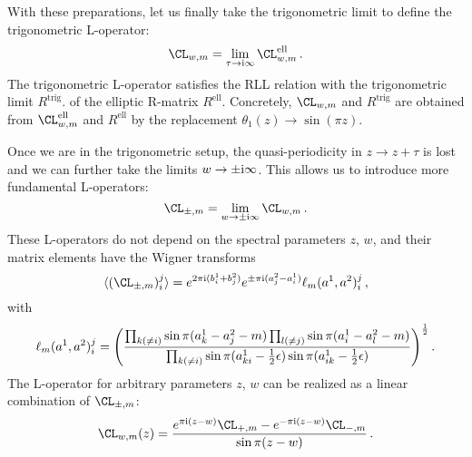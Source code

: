 With these preparations, let us finally take the trigonometric limit
to define the trigonometric L-operator:
\begin{equation}
  \CL_{w,m}
  = \lim_{\tau \to \iu\infty} \CL^{\text{ell}}_{w,m} \,.
\end{equation}
The trigonometric L-operator satisfies the RLL relation with the
trigonometric limit $R^{\text{trig}}$. of the elliptic R-matrix
$R^{\text{ell}}$.  Concretely, $\CL_{w,m}$ and $R^{\text{trig}}$ are
obtained from $\CL^{\text{ell}}_{w,m}$ and $R^{\text{ell}}$ by the
replacement $\theta_1(z) \to \sin(\pi z)$.

Once we are in the trigonometric setup, the quasi-periodicity in
$z \to z + \tau$ is lost and we can further take the limits
$w \to \pm\mathrm{i}\infty$.  This allows us to introduce more fundamental
L-operators:
\begin{equation}
  \label{eq:fund-L}
  \CL_{\pm,m} = \lim_{w \to \pm\iu\infty} \CL_{w,m} \,.
\end{equation}
These L-operators do not depend on the spectral parameters $z$, $w$,
and their matrix elements have the Wigner transforms
\begin{equation}
  \label{eq:fund-L-ij}
  \vev{(\CL_{\pm,m})_i^j}
  =
  e^{2\pi\iu(b_i^1 + b_j^2)}
  e^{\pm\pi\iu(a^2_j - a^1_i)}
  \ell_m(a^1, a^2)_i^j \,,
\end{equation}
with
\begin{equation}
  \label{eq:ell}
  \ell_m(a^1, a^2)_i^j
  =
  \Biggl(
  \frac{\prod_{k (\neq i)} \sin\pi(a^1_k - a^2_j - m)
        \prod_{l (\neq j)} \sin\pi(a^1_i - a^2_l - m)}
       {\prod_{k (\neq i)}\sin\pi(a^1_{ki} - \frac12\epsilon)
        \sin\pi(a^1_{ik} - \frac12\epsilon)}
  \Biggr)^{\frac12}
  \,.
\end{equation}
The L-operator for arbitrary parameters $z$, $w$ can be realized as a
linear combination of $\CL_{\pm,m}$:
\begin{equation}
  \CL_{w,m}(z)
  =
  \frac{e^{\pi\iu(z-w)} \CL_{+,m} - e^{-\pi\iu(z-w)} \CL_{-,m}}{\sin\pi(z-w)}
  \,.
\end{equation}

